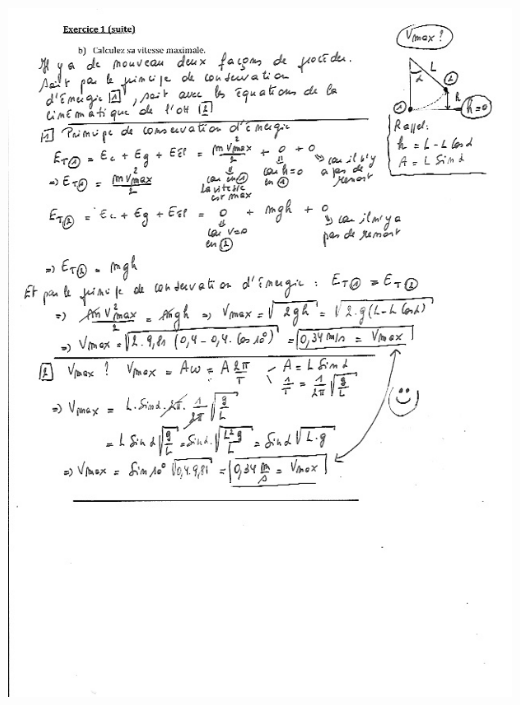 \includegraphics[width=17.498cm,height=26.174cm]{Pictures/1000000100000264000003457EC57F1EEB41A85F.png}

